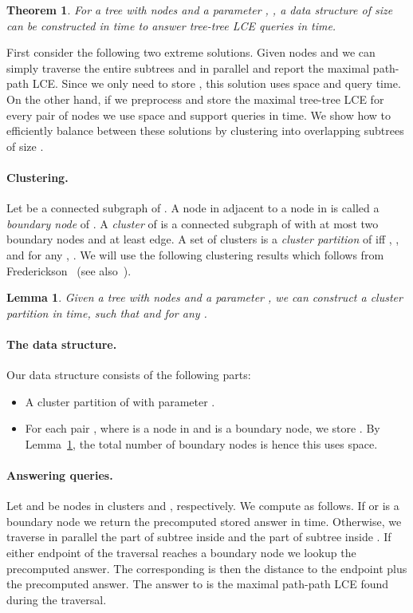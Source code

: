 \documentclass [10pt]{article}
\newtheorem{lemma}{Lemma}
\newtheorem{theorem}{Theorem}
\begin{document}
\begin{theorem}\label{thm:lcett}
For a tree  with  nodes and a parameter , , a data structure of size  can be constructed in  time to answer tree-tree LCE queries in  time. 
\end{theorem}

First consider the following two extreme solutions. Given nodes  and  we can simply traverse the entire subtrees  and  in parallel and report the maximal path-path LCE. Since we only need to store , this solution uses  space and  query time. On the other hand, if we preprocess and store the maximal tree-tree LCE for every pair of nodes we use  space and support queries in  time. We show how to efficiently balance between these solutions by clustering  into  overlapping subtrees of size .

\paragraph{Clustering.} 
Let  be a connected subgraph of . A node in  adjacent to a node in  is called a \emph{boundary node} of . A \emph{cluster} of  is a connected subgraph of  with at most two boundary nodes and at least  edge. A set of clusters  is a \emph{cluster partition} of  iff , , and for any , . We will use the following clustering results which follows from Frederickson~\cite{frederickson1997} (see also~\cite{AHLT1997, AHT2000, BG2011}).

\begin{lemma}\label{lem:clustering}
Given a tree  with  nodes and a parameter , we can construct a cluster partition  in  time, such that  and  for any . 
\end{lemma}

\paragraph{The data structure.}
Our data structure consists of the following parts: 
\begin{itemize} 
\item A cluster partition  of  with parameter .
\item For each pair , where  is a node in  and  is a boundary node, we store . By Lemma~\ref{lem:clustering}, the total number of boundary nodes is  hence this uses  space. 
\end{itemize}

\paragraph{Answering queries.}
Let  and  be nodes in clusters  and , respectively. We compute   as follows. If  or  is a boundary node we return the precomputed stored answer in  time. Otherwise, we traverse  in parallel the part of subtree  inside  and the part of subtree  inside . If either endpoint of the traversal reaches a boundary node we lookup the precomputed answer. The corresponding  is then the distance to the endpoint plus the precomputed answer. The answer to  is the maximal path-path LCE found during the traversal.
\end{document}

